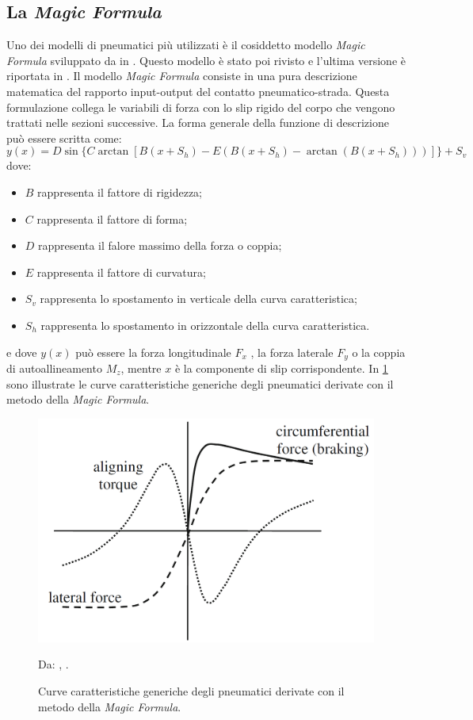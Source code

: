 \subsection{La \textit{Magic Formula}}
Uno dei modelli di pneumatici più utilizzati è il cosiddetto modello \textit{Magic Formula} sviluppato da \citeauthor{bakker} in \cite{bakker}. Questo modello è stato poi rivisto e l'ultima versione è riportata in \cite{hans}. Il modello \textit{Magic Formula} consiste in una pura descrizione matematica del rapporto input-output del contatto pneumatico-strada. Questa formulazione collega le variabili di forza con lo slip rigido del corpo che vengono trattati nelle sezioni successive. La forma generale della funzione di descrizione può essere scritta come:
%
\begin{equation}
y(x) = D\sin\{C\arctan[B(x + S_h ) - E(B(x + S_h ) - \arctan(B(x + S_h )))]\} + S_v
\end{equation}
%
dove:
\begin{itemize}
	\item $B$ rappresenta il fattore di rigidezza;
	\item $C$ rappresenta il fattore di forma;
	\item $D$ rappresenta il falore massimo della forza o coppia;
	\item $E$ rappresenta il fattore di curvatura;
	\item $S_v$ rappresenta lo spostamento in verticale della curva caratteristica;
	\item $S_h$ rappresenta lo spostamento in orizzontale della curva caratteristica.
\end{itemize}
e dove $y(x)$ può essere la forza longitudinale $F_x$ , la forza laterale $F_y$ o la coppia di autoallineamento $M_z$, mentre $x$ è la componente di slip corrispondente. In \figurename{ \ref{pacejka}} sono illustrate le curve caratteristiche generiche degli pneumatici derivate con il metodo della \textit{Magic Formula}.
%
\begin{figure}[h]
	\centering
	\includegraphics[width=0.58\linewidth]{Figures/pacejka}
	\caption{Curve caratteristiche generiche degli pneumatici derivate con il metodo della \textit{Magic Formula}.}
	Da: \citeauthor{Schramm}, .
	\label{pacejka}
\end{figure}

